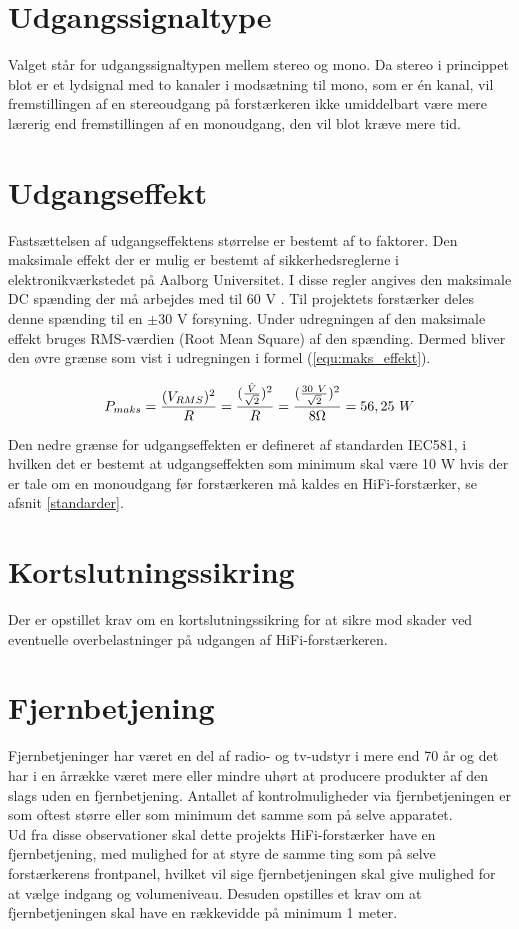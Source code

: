 \section{Udgangssignaltype}
\label{krav_udgangssignaltype}
Valget står for udgangssignaltypen mellem stereo og mono. Da stereo i princippet blot er et lydsignal med to kanaler i modsætning til mono, som er én kanal, vil fremstillingen af en stereoudgang på forstærkeren ikke umiddelbart være mere lærerig end fremstillingen af en monoudgang, den vil blot kræve mere tid.

\section{Udgangseffekt}
\label{krav_udgangseffekt}
Fastsættelsen af udgangseffektens størrelse er bestemt af to faktorer. Den maksimale effekt der er mulig er bestemt af sikkerhedsreglerne i elektronikværkstedet på Aalborg Universitet. I disse regler angives den maksimale DC spænding der må arbejdes med til 60 V \cite{elregler-b1101}. 
Til projektets forstærker deles denne spænding til en $\pm$30 V forsyning. Under udregningen af den maksimale effekt bruges RMS-værdien (Root Mean Square) af den spænding. Dermed bliver den øvre grænse som vist i udregningen i formel (\ref{equ:maks_effekt}).

\begin{equation}
\label{equ:maks_effekt}
P_{maks} = \frac{(V_{RMS})^2}{R}= \frac{(\frac{\hat{V}}{\sqrt{2}})^2}{R} = \frac{(\frac{30~V}{\sqrt{2}})^2}{8\ohm} = 56,25~W
\end{equation}

Den nedre grænse for udgangseffekten er defineret af standarden IEC581, i hvilken det er bestemt at udgangseffekten som minimum skal være 10 W hvis der er tale om en monoudgang før forstærkeren må kaldes en HiFi-forstærker, se afsnit \ref{standarder}.

\section{Kortslutningssikring}
\label{krav_kortslutningssikring}
Der er opstillet krav om en kortslutningssikring for at sikre mod skader ved eventuelle overbelastninger på udgangen af HiFi-forstærkeren.

\section{Fjernbetjening}
\label{krav_fjernbetjening}
Fjernbetjeninger har været en del af radio- og tv-udstyr i mere end 70 år og det har i en årrække været mere eller mindre uhørt at producere produkter af den slags uden en fjernbetjening.
Antallet af kontrolmuligheder via fjernbetjeningen er som oftest større eller som minimum det samme som på selve apparatet.\\
Ud fra disse observationer skal dette projekts HiFi-forstærker have en fjernbetjening, med mulighed for at styre de samme ting som på selve forstærkerens frontpanel, hvilket vil sige fjernbetjeningen skal give mulighed for at vælge indgang og volumeniveau. Desuden opstilles et krav om at fjernbetjeningen skal have en rækkevidde på minimum 1 meter.

